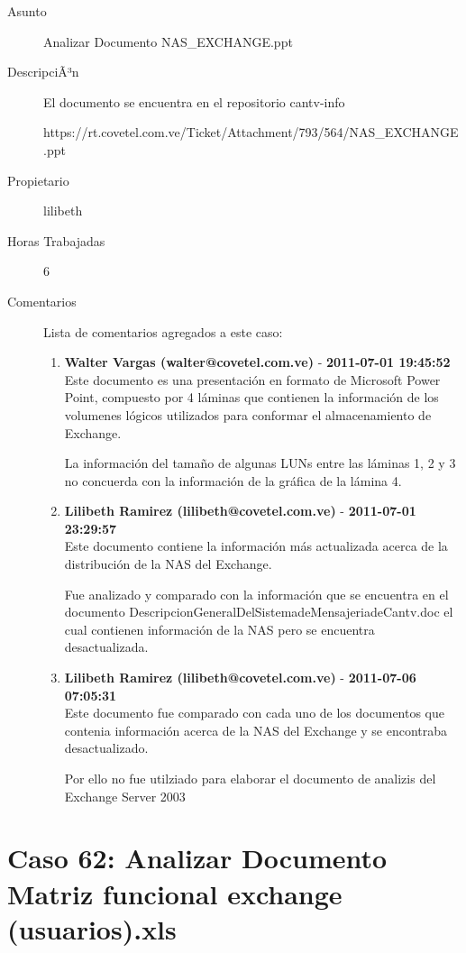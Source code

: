 \begin{description}

\item[Asunto] Analizar Documento NAS_EXCHANGE.ppt\item[DescripciÃ³n] El documento se encuentra en el repositorio cantv-info

https://rt.covetel.com.ve/Ticket/Attachment/793/564/NAS_EXCHANGE.ppt\item[Propietario] lilibeth\item[Horas Trabajadas] 6

\item[Comentarios] Lista de comentarios agregados a este caso:  
\begin{enumerate}
        \item {\bfseries Walter Vargas (walter@covetel.com.ve)  } - {\bfseries 2011-07-01 19:45:52} \\ Este documento es una presentación en formato de Microsoft Power Point,
compuesto por 4 láminas que contienen la información de los volumenes lógicos
utilizados para conformar el almacenamiento de Exchange.

La información del tamaño de algunas LUNs entre las láminas 1, 2 y 3 no
concuerda con la información de la gráfica de la lámina 4.        \item {\bfseries Lilibeth Ramirez (lilibeth@covetel.com.ve)  } - {\bfseries 2011-07-01 23:29:57} \\ Este documento contiene la información más actualizada acerca de la
distribución de la NAS del Exchange.

Fue analizado y comparado con la información que se encuentra en el documento
DescripcionGeneralDelSistemadeMensajeriadeCantv.doc el cual contienen
información de la NAS pero se encuentra desactualizada.        \item {\bfseries Lilibeth Ramirez (lilibeth@covetel.com.ve)  } - {\bfseries 2011-07-06 07:05:31} \\ Este documento fue comparado con cada uno de los documentos que contenia
información acerca de la NAS del Exchange y se encontraba desactualizado.

Por ello no fue utilziado para elaborar el documento de analizis del Exchange
Server 2003    \end{enumerate}

\end{description}

\section{Caso 62: Analizar Documento Matriz funcional exchange (usuarios).xls }

